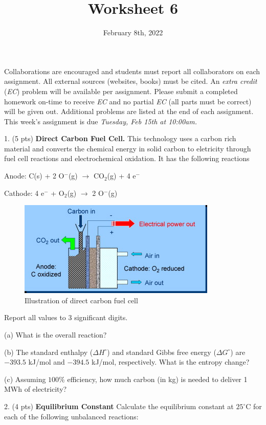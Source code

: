 \documentclass[11pt]{article}
\title{\textbf{Worksheet 6}}
\date{\vspace{-2em}February 8th, 2022}
\begin{document}
\maketitle

Collaborations are encouraged and students must report all collaborators
on each assignment. All external sources (websites, books) must be
cited. An \textit{extra credit} (\textit{EC}) problem will be available per
assignment. Please submit a completed homework on-time to receive \textit{EC}
and no partial \textit{EC} (all parts must be correct) will be given out.
Additional problems are listed at the end of each assignment. This week's
assignment is due \textit{Tuesday, Feb 15th at 10:00am.}

1. (5 pts) \textbf{Direct Carbon Fuel Cell.} This technology uses a carbon rich
material and converts the chemical energy in solid carbon to eletricity through
fuel cell reactions and electrochemical oxidation. It has the following reactions

  Anode: C(s) + 2 O$^-$(g) $\rightarrow$ CO$_2$(g) + 4 e$^-$

  Cathode: 4 e$^-$ + O$_2$(g) $\rightarrow$ 2 O$^-$(g)

\begin{figure}[hbpt]
  \centering
  \includegraphics[scale=1]{direct_carbon.jpg}
  \caption{Illustration of direct carbon fuel cell}
\end{figure}
Report all values to 3 significant digits.

(a) What is the overall reaction?

(b) The standard enthalpy ($\Delta H^\circ$) and standard Gibbs
free energy ($\Delta G^\circ$) are $-393.5$ kJ/mol and $-394.5$ kJ/mol,
respectively. What is the entropy change?

(c) Assuming $100\%$ efficiency, how much carbon (in kg) is needed to deliver
1 MWh of electricity?

\pagebreak

2. (4 pts) \textbf{Equilibrium Constant} Calculate the equilibrium constant
at $25^\circ\text{C}$ for each of the following unbalanced reactions:
\end{document}
